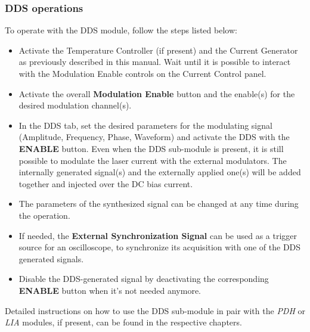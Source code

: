 \subsubsection{DDS operations}
To operate with the DDS module, follow the steps listed below:
\begin{itemize}
    \item Activate the Temperature Controller (if present) and the Current Generator as previously described in this manual. Wait until it is possible to interact with the Modulation Enable controls on the Current Control panel.
    
    \item Activate the overall \textbf{Modulation Enable} button and the enable(s) for the desired modulation channel(s).
    
    \item In the DDS tab, set the desired parameters for the modulating signal (Amplitude, Frequency, Phase, Waveform) and activate the DDS with the \textbf{ENABLE} button.
    \newline Even when the DDS sub-module is present, it is still possible to modulate the laser current with the external modulators. The internally generated signal(s) and the externally applied one(s) will be added together and injected over the DC bias current.
    
    \item The parameters of the synthesized signal can be changed at any time during the operation.
    
    \item If needed, the \textbf{External Synchronization Signal} can be used as a trigger source for an oscilloscope, to synchronize its acquisition with one of the DDS generated signals.
    
    \item Disable the DDS-generated signal by deactivating the corresponding \textbf{ENABLE} button when it's not needed anymore.
\end{itemize}

Detailed instructions on how to use the DDS sub-module in pair with the \textit{PDH} or \textit{LIA} modules, if present, can be found in the respective chapters.